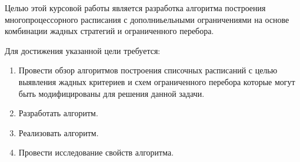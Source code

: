 Целью этой курсовой работы является разработка алгоритма построения многопроцессорного расписания с дополниьельными ограничениями на основе комбинации жадных стратегий и ограниченного перебора. 

Для достижения указанной цели требуется:
\begin{enumerate}
    \item Провести обзор алгоритмов построения списочных расписаний с целью выявления жадных критериев и схем ограниченного перебора которые могут быть модифицированы для решения данной задачи.
    \item Разработать алгоритм.
    \item Реализовать алгоритм.
    \item Провести исследование свойств алгоритма. 
\end{enumerate}
